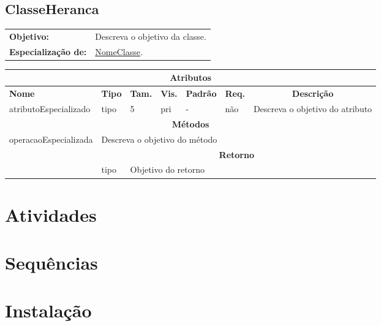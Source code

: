 \documentclass[12pt,openright,a4paper,brazil]{abntex2}
\begin{document}
\clearpage
\subsection{ClasseHeranca}
\label{cls:ClasseHeranca}

\begin{tabular}{p{.25\linewidth}p{.7\linewidth}}
	\textbf{Objetivo:} & Descreva o objetivo da classe. \\
	\textbf{Especialização de:} & \hyperref[cls:NomeClasse]{NomeClasse}.
\end{tabular}

\begin{table}[h]
	\tiny
	\setlength\extrarowheight{5pt}
	\begin{tabular}{p{}p{}p{}p{}p{}p{}p{}}
		\hline
		\multicolumn{7}{c}{\textbf{Atributos}} \\
		\hline
		\centering \textbf{Nome} & \centering \textbf{Tipo} & \textbf{Tam.} & \textbf{Vis.} & \centering \textbf{Padrão} & \textbf{Req.} & \multicolumn{1}{c}{\textbf{Descrição}} \\ \hline
		atributoEspecializado & tipo & 5 & pri & - & não & Descreva o objetivo do atributo \\ \hline
		
		\multicolumn{7}{c}{\textbf{Métodos}} \\ \hline
		\multirow{3}{*}{operacaoEspecializada} & \multicolumn{6}{l}{Descreva o objetivo do método} \\ \cline{2-7}
		& \multicolumn{6}{c}{\textbf{Retorno}} \\ \cline{2-7}
		& tipo &  \multicolumn{5}{l}{Objetivo do retorno} \\ \hline
	\end{tabular} 
\end{table}	

\clearpage

\section{Atividades}

\section{Sequências}

\section{Instalação}
\end{document}
